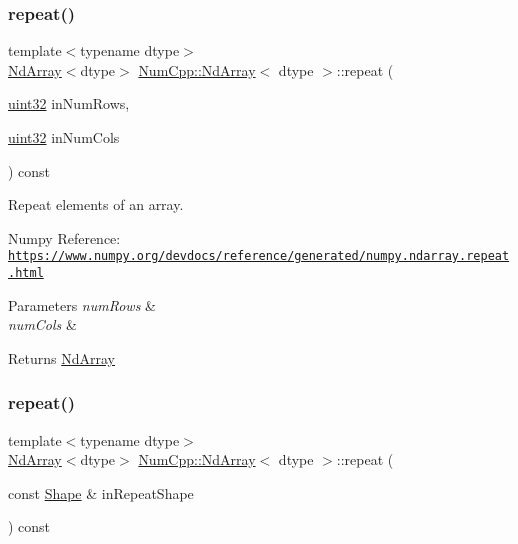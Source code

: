 \subsubsection{\texorpdfstring{repeat()}{repeat()}\hspace{0.1cm}{\footnotesize\ttfamily [1/2]}}
{\footnotesize\ttfamily template$<$typename dtype$>$ \\
\mbox{\hyperlink{class_num_cpp_1_1_nd_array}{Nd\+Array}}$<$dtype$>$ \mbox{\hyperlink{class_num_cpp_1_1_nd_array}{Num\+Cpp\+::\+Nd\+Array}}$<$ dtype $>$\+::repeat (\begin{DoxyParamCaption}\item[{\mbox{\hyperlink{namespace_num_cpp_a36f388e948380413c63011cab9b7fbd5}{uint32}}}]{in\+Num\+Rows,  }\item[{\mbox{\hyperlink{namespace_num_cpp_a36f388e948380413c63011cab9b7fbd5}{uint32}}}]{in\+Num\+Cols }\end{DoxyParamCaption}) const\hspace{0.3cm}{\ttfamily [inline]}}

Repeat elements of an array.

Numpy Reference\+: \href{https://www.numpy.org/devdocs/reference/generated/numpy.ndarray.repeat.html}{\tt https\+://www.\+numpy.\+org/devdocs/reference/generated/numpy.\+ndarray.\+repeat.\+html}


\begin{DoxyParams}{Parameters}
{\em num\+Rows} & \\
\hline
{\em num\+Cols} & \\
\hline
\end{DoxyParams}
\begin{DoxyReturn}{Returns}
\mbox{\hyperlink{class_num_cpp_1_1_nd_array}{Nd\+Array}} 
\end{DoxyReturn}
\mbox{\label{class_num_cpp_1_1_nd_array_aaec180affbe1c55911a53bce2667e17e}} 
\subsubsection{\texorpdfstring{repeat()}{repeat()}\hspace{0.1cm}{\footnotesize\ttfamily [2/2]}}
{\footnotesize\ttfamily template$<$typename dtype$>$ \\
\mbox{\hyperlink{class_num_cpp_1_1_nd_array}{Nd\+Array}}$<$dtype$>$ \mbox{\hyperlink{class_num_cpp_1_1_nd_array}{Num\+Cpp\+::\+Nd\+Array}}$<$ dtype $>$\+::repeat (\begin{DoxyParamCaption}\item[{const \mbox{\hyperlink{class_num_cpp_1_1_shape}{Shape}} \&}]{in\+Repeat\+Shape }\end{DoxyParamCaption}) const\hspace{0.3cm}{\ttfamily [inline]}}

